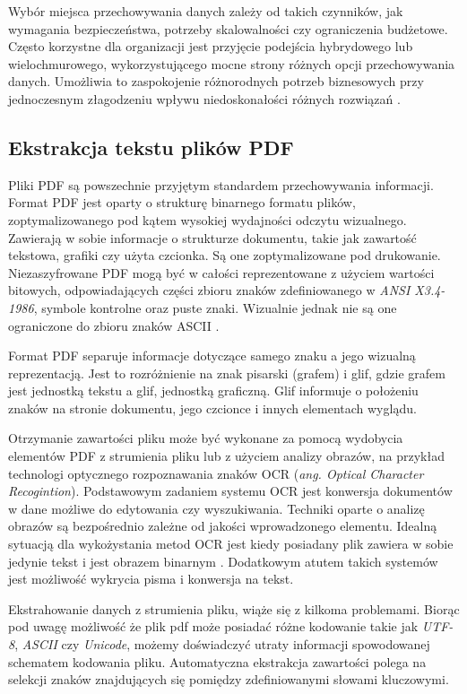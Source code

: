 \documentclass[12pt,a4paper,twoside]{article}
\begin{document}
Wybór miejsca przechowywania danych zależy od takich czynników, jak wymagania bezpieczeństwa, potrzeby skalowalności czy ograniczenia budżetowe. Często korzystne dla organizacji jest przyjęcie podejścia hybrydowego lub wielochmurowego, wykorzystującego mocne strony różnych opcji przechowywania danych. Umożliwia to zaspokojenie różnorodnych potrzeb biznesowych przy jednoczesnym złagodzeniu wpływu niedoskonałości różnych rozwiązań \cite{Ho2022}.
\subsection{Ekstrakcja tekstu plików PDF}
Pliki PDF są powszechnie przyjętym standardem przechowywania informacji. Format PDF jest oparty o strukturę binarnego formatu plików, zoptymalizowanego pod kątem wysokiej wydajności odczytu wizualnego. Zawierają w sobie informacje o strukturze dokumentu, takie jak zawartość tekstowa, grafiki czy użyta czcionka. Są one zoptymalizowane pod drukowanie. Niezaszyfrowane PDF mogą być w całości reprezentowane z użyciem wartości bitowych, odpowiadających części zbioru znaków zdefiniowanego w \textit{ANSI X3.4-1986}, symbole kontrolne oraz puste znaki. Wizualnie jednak nie są one ograniczone do zbioru znaków ASCII \cite{ISO32000}.\par
Format PDF separuje informacje dotyczące samego znaku a jego wizualną reprezentacją. Jest to rozróżnienie na znak pisarski (grafem) i glif, gdzie grafem jest jednostką tekstu a glif, jednostką graficzną. Glif informuje o położeniu znaków na stronie dokumentu, jego czcionce i innych elementach wyglądu. \par
Otrzymanie zawartości pliku może być wykonane za pomocą wydobycia elementów PDF z strumienia pliku lub z użyciem analizy obrazów, na przykład technologi optycznego rozpoznawania znaków OCR (\textit{ang. Optical Character Recogintion}). 
Podstawowym zadaniem systemu OCR jest konwersja dokumentów w dane możliwe do edytowania czy wyszukiwania. Techniki oparte o analizę obrazów są bezpośrednio zależne od jakości wprowadzonego elementu. Idealną sytuacją dla wykożystania metod OCR jest kiedy posiadany plik zawiera w sobie jedynie tekst i jest obrazem binarnym \cite{mithe2013optical}. Dodatkowym atutem takich systemów jest możliwość wykrycia pisma i konwersja na tekst.\par
Ekstrahowanie danych z strumienia pliku, wiąże się z kilkoma problemami. Biorąc pod uwagę możliwość że plik pdf może posiadać różne kodowanie takie jak \textit{UTF-8}, \textit{ASCII} czy \textit{Unicode}, możemy doświadczyć utraty informacji spowodowanej schematem kodowania pliku. Automatyczna ekstrakcja zawartości polega na selekcji znaków znajdujących się pomiędzy zdefiniowanymi słowami kluczowymi. \par
\end{document}
